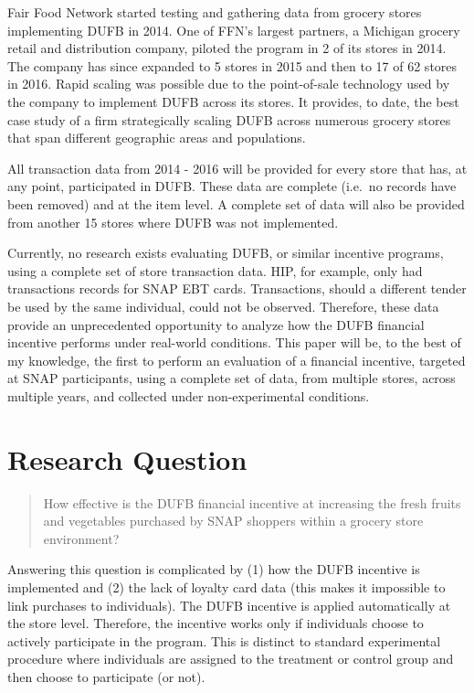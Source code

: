 \documentclass[12pt,letterpaperpaper,]{book}
\begin{document}
Fair Food Network started testing and gathering data from grocery stores
implementing DUFB in 2014. One of FFN's largest partners, a Michigan
grocery retail and distribution company, piloted the program in 2 of its
stores in 2014. The company has since expanded to 5 stores in 2015 and
then to 17 of 62 stores in 2016. Rapid scaling was possible due to the
point-of-sale technology used by the company to implement DUFB across
its stores. It provides, to date, the best case study of a firm
strategically scaling DUFB across numerous grocery stores that span
different geographic areas and populations.

All transaction data from 2014 - 2016 will be provided for every store
that has, at any point, participated in DUFB. These data are complete
(i.e.~no records have been removed) and at the item level. A complete
set of data will also be provided from another 15 stores where DUFB was
not implemented.

Currently, no research exists evaluating DUFB, or similar incentive
programs, using a complete set of store transaction data. HIP, for
example, only had transactions records for SNAP EBT cards. Transactions,
should a different tender be used by the same individual, could not be
observed. Therefore, these data provide an unprecedented opportunity to
analyze how the DUFB financial incentive performs under real-world
conditions. This paper will be, to the best of my knowledge, the first
to perform an evaluation of a financial incentive, targeted at SNAP
participants, using a complete set of data, from multiple stores, across
multiple years, and collected under non-experimental conditions.

\section*{Research Question}\label{research-question}

\begin{quote}
How effective is the DUFB financial incentive at increasing the fresh
fruits and vegetables purchased by SNAP shoppers within a grocery store
environment?
\end{quote}

Answering this question is complicated by (1) how the DUFB incentive is
implemented and (2) the lack of loyalty card data (this makes it
impossible to link purchases to individuals). The DUFB incentive is
applied automatically at the store level. Therefore, the incentive works
only if individuals choose to actively participate in the program. This
is distinct to standard experimental procedure where individuals are
assigned to the treatment or control group and then choose to
participate (or not).
\end{document}
